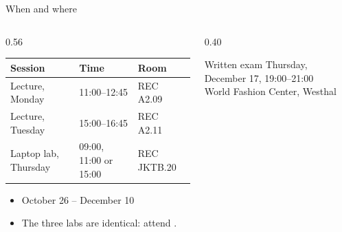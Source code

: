 \documentclass[handout,aspectratio=169,t,9pt]{beamer}
\begin{document}
\begin{frame}{When and where}
  \begin{columns}[T,onlytextwidth]
    \begin{column}{0.56\textwidth}
      \begin{tabular}{@{}lll@{}}
        \toprule
        \textbf{Session} & \textbf{Time} & \textbf{Room} \\
        \midrule
        Lecture, Monday      & 11:00--12:45 & REC A2.09 \\
        Lecture, Tuesday     & 15:00--16:45 & REC A2.11 \\
        Laptop lab, Thursday & 09:00, 11:00 or 15:00 & REC JKTB.20 \\
        \bottomrule
      \end{tabular}

      \vspace{0.4cm}
      \begin{itemize}
        \item October 26 -- December 10
        \item The three labs are identical: attend .
      \end{itemize}
    \end{column}
    \begin{column}{0.40\textwidth}
      \begin{sibbox}{Written exam}
        Thursday, December 17, 19:00--21:00\\
        World Fashion Center, Westhal
      \end{sibbox}
    \end{column}
  \end{columns}

  \vfill

\end{frame}
\end{document}
